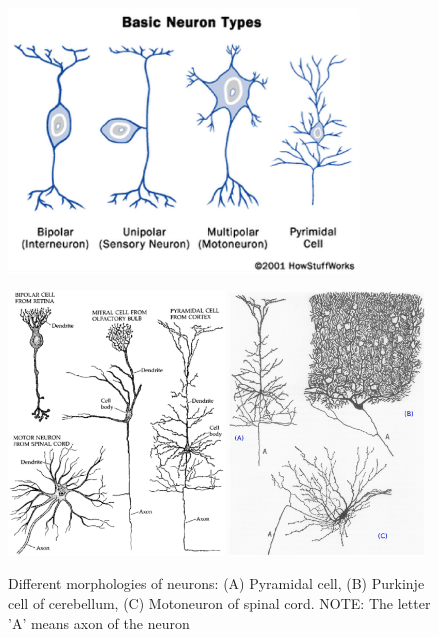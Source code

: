 \begin{figure}[hbt]
  \centerline{\includegraphics[height=7cm,
    angle=0]{./images/neuron_types.eps}}

  \centerline{\includegraphics[height=7cm,
    angle=0]{./images/neurons.eps}
  \includegraphics[height=7cm,
    angle=0]{./images/neuron_cells.eps}
    }
\caption{Different morphologies of neurons: (A) Pyramidal cell, (B) Purkinje
cell of cerebellum, (C) Motoneuron of spinal cord. NOTE: The letter 'A' means axon of the neuron}
\label{fig:neuron_cell}
\end{figure}


